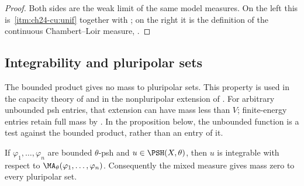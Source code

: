 \begin{proof}
Both sides are the weak limit of the same model measures.  On the left this
is \,\cref{itm:ch24-cu:unif} together with
; on the right it is the definition of the
continuous Chambert--Loir measure,
.
\end{proof}

\subsection{Integrability and pluripolar sets}
\label{sec:ch24-integrability}

The bounded product gives no mass to pluripolar sets. This property is used in the capacity theory of  and in the nonpluripolar extension of . For arbitrary unbounded psh entries, that extension can have mass less than $V$; finite-energy entries retain full mass by . In the proposition below, the unbounded function is a test against the bounded product, rather than an entry of it.

\begin{proposition}\label{prop:bounded-ma-no-polar-mass}
If $\varphi_1,\ldots,\varphi_n$ are bounded $\theta$-psh and
$u\in\PSH(X,\theta)$, then $u$ is integrable with respect to
$\MA_\theta(\varphi_1,\ldots,\varphi_n)$. Consequently the mixed measure
gives mass zero to every pluripolar set.
\end{proposition}

